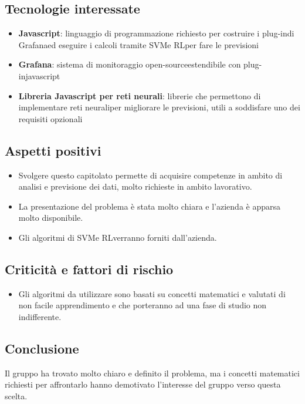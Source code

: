 \subsection{Tecnologie interessate}
\begin{itemize}
	\item \textbf{Javascript}: linguaggio di programmazione richiesto per costruire i plug-in\glosp di Grafana\glosp ed eseguire i calcoli tramite SVM\glosp e RL\glosp per fare le previsioni
	\item \textbf{Grafana}: sistema di monitoraggio open-source\glosp estendibile con plug-in\glosp javascript\glo
	\item \textbf{Libreria Javascript per reti neurali}: librerie che permettono di implementare reti neurali\glosp per migliorare le previsioni, utili a soddisfare uno dei requisiti opzionali
\end{itemize}
 
\subsection{Aspetti positivi}
\begin{itemize} 
	\item Svolgere questo capitolato permette di acquisire competenze in ambito di analisi e previsione dei dati, molto richieste in ambito lavorativo.
	\item La presentazione del problema è stata molto chiara e l'azienda è apparsa molto disponibile.
	\item Gli algoritmi di SVM\glosp e RL\glosp verranno forniti dall'azienda.
\end{itemize}
\subsection{Criticità e fattori di rischio}
\begin{itemize}
	\item Gli algoritmi da utilizzare sono basati su concetti matematici e valutati di non facile apprendimento e che porteranno ad una fase di studio non indifferente. 
\end{itemize}
\subsection{Conclusione}
Il gruppo ha trovato molto chiaro e definito il problema, ma i concetti matematici richiesti per affrontarlo hanno demotivato l'interesse del gruppo verso questa scelta.